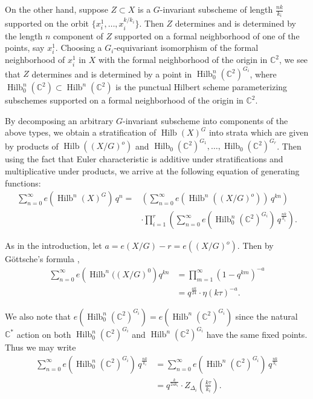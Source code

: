 \documentclass{amsart}
\theoremstyle{definition}
\newcommand{\CC} {{\mathbb C}}          %
\newcommand{\Hilb}{\operatorname{Hilb}}
\begin{document}
On the other hand, suppose $Z\subset X$ is a $G$-invariant subscheme
of length $\frac{nk}{k_{i}}$ supported on the orbit
$\{x_{i}^{1},\dotsc ,x_{i}^{k/k_{i}} \}$. Then $Z$ determines and is
determined by the length $n$ component of $Z$ supported on a formal
neighborhood of one of the points, say $x_{i}^{1}$. Choosing a
$G_{i}$-equivariant isomorphism of the formal neighborhood of
$x_{i}^{1}$ in $X$ with the formal neighborhood of the origin in
$\CC^{2}$, we see that $Z$ determines and is determined by a point in
$\Hilb_{0}^{n}(\CC^{2})^{G_{i}}$, where $\Hilb_{0}^{n}(\CC^{2})\subset
\Hilb^{n}(\CC^{2})$ is the punctual Hilbert scheme parameterizing
subschemes supported on a formal neighborhood of the origin in
$\CC^{2}$.

By decomposing an arbitrary $G$-invariant subscheme into components of
the above types, we obtain a stratification of $\Hilb (X)^{G}$ into
strata which are given by products of $\Hilb ((X/G)^{o})$ and
$\Hilb_{0}(\CC^{2})^{G_{1}},\dotsc ,\Hilb_{0}(\CC^{2})^{G_{r}}$. Then
using the fact that Euler characteristic is additive under
stratifications and multiplicative under products, we arrive at the
following equation of generating functions:
\begin{align}\label{eqn: stratification formula for sum e(hilb(X)G)}
\nonumber\sum_{n=0}^{\infty} e\left(\Hilb^{n}(X)^{G} \right)\, q^{n}
=&\left(\sum_{n=0}^{\infty} e\left(\Hilb^{n}((X/G)^{o}) \right)\,
q^{kn} \right)\\
& \cdot \prod_{i=1}^{r}\left( \sum_{n=0}^{\infty}
e\left(\Hilb_{0}^{n}(\CC^{2})^{G_{i}} \right) \, q^{\frac{nk}{k_{i}}}
\right) .
\end{align}

As in the introduction, let $a = e(X/G)-r=e\left((X/G)^{o}
\right)$. Then by G\"ottsche's formula \cite{gottsche1990betti},
\begin{align*}
\sum_{n=0}^{\infty} e\left(\Hilb^{n}((X/G)^{0} \right) q^{kn} &=
\prod_{m=1}^{\infty} (1-q^{km})^{-a}\\
&= q^{\frac{ak}{24}} \cdot \eta (k\tau )^{-a}. 
\end{align*}

We also note that $e\left(\Hilb_{0}^{n}(\CC^{2})^{G_{i}}
\right)=e\left(\Hilb^{n}(\CC^{2})^{G_{i}} \right)$ since the natural
$\CC^{*}$ action on both $\Hilb_{0}^{n}(\CC^{2})^{G_{i}}$ and
$\Hilb^{n}(\CC^{2})^{G_{i}}$ have the same fixed points. Thus we may
write
\begin{align*}
\sum_{n=0}^{\infty} e\left(\Hilb_{0}^{n}(\CC^{2})^{G_{i}} \right) \,
q^{\frac{nk}{k_{i}}} &= \sum_{n=0}^{\infty} e\left(\Hilb^{n}(\CC^{2})^{G_{i}} \right) \,
q^{\frac{nk}{k_{i}}}\\
&= q^{\frac{k}{24k_{i}}} \cdot Z_{\Delta_{i}} \left(\frac{k\tau}{k_{i}}
\right) .
\end{align*}
\end{document}
